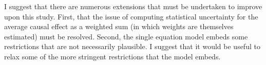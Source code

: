 \documentclass[12pt,a4paper,twoside]{article}
\numberwithin{equation}{section}
\begin{document}
I suggest that there are numerous extensions that must be undertaken to improve upon this study. First, that the issue of computing statistical uncertainty for the average causal effect as a weighted sum (in which weights are themselves estimated) must be resolved. Second, the single equation model embeds some restrictions that are not necessarily plausible. I suggest that it would be useful to relax some of the more stringent restrictions that the model embeds.
%
\end{document}
